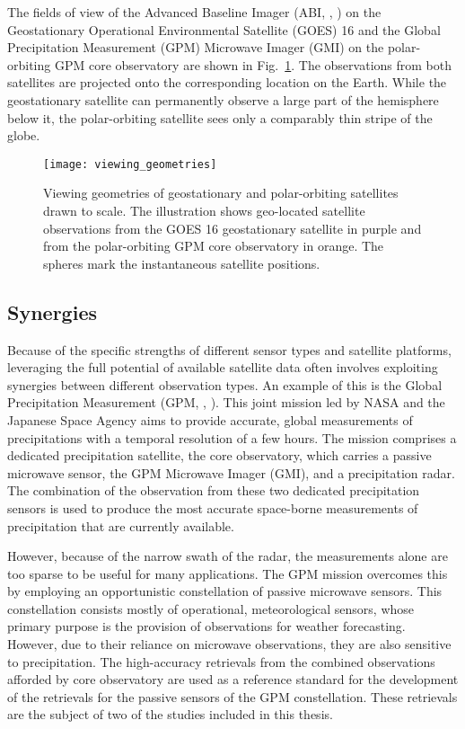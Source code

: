 The fields of view of the Advanced Baseline Imager (ABI, \citeauthor{schmit18},
\citeyear{schmit18}) on the Geostationary
Operational Environmental Satellite (GOES) 16 and the Global Precipitation
Measurement (GPM) Microwave Imager (GMI) on the polar-orbiting GPM core
observatory are shown in Fig.~\ref{fig:radiative_transfer:viewing_geometries}. The
observations from both satellites are projected onto the corresponding location
on the Earth. While the geostationary satellite can permanently observe a large
part of the hemisphere below it, the polar-orbiting satellite sees only a
comparably thin stripe of the globe.

\begin{figure}[!hbpt]
  \centering
  \texttt{[image: viewing\_geometries]}
  \caption{Viewing geometries of geostationary and polar-orbiting satellites
  drawn to scale. The illustration shows geo-located satellite observations from
  the GOES 16 geostationary satellite in purple and from the polar-orbiting GPM
  core observatory in orange. The spheres mark the instantaneous satellite
  positions.}
  \label{fig:radiative_transfer:viewing_geometries}
\end{figure}

\subsection{Synergies}
\label{sec:radiative_transfer:synergies}

Because of the specific strengths of different sensor types and satellite
platforms, leveraging the full potential of available satellite data often
involves exploiting synergies between different observation types. An example of
this is the Global Precipitation Measurement (GPM, \citeauthor{hou14},
\citeyear{hou14}). This joint mission led by NASA and the Japanese Space
Agency aims to provide accurate, global measurements of precipitations with a
temporal resolution of a few hours. The mission comprises a dedicated precipitation
satellite, the core observatory, which carries a passive microwave sensor, the
GPM Microwave Imager (GMI), and a precipitation radar. The combination of the
observation from these two dedicated precipitation sensors is used to produce the
most accurate space-borne measurements of precipitation that are currently
available.

However, because of the narrow swath of the radar, the measurements alone are
too sparse to be useful for many applications. The GPM mission overcomes this by
employing an opportunistic constellation of passive microwave sensors. This
constellation consists mostly of operational, meteorological sensors, whose
primary purpose is the provision of observations for weather forecasting.
However, due to their reliance on microwave observations, they are also
sensitive to precipitation. The high-accuracy retrievals from the combined
observations afforded by core observatory are used as a reference standard for
the development of the retrievals for the passive sensors of the GPM
constellation. These retrievals are  the subject of two of the studies
included in this thesis.

